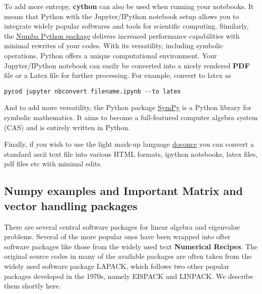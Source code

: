 \documentclass[%
oneside,                 %
final,                   %
10pt]{article}
\begin{document}
To add more entropy, \textbf{cython} can also be used when running your
notebooks. It means that Python with the Jupyter/IPython notebook
setup allows you to integrate widely popular softwares and tools for
scientific computing. Similarly, the 
\href{{https://numba.pydata.org/}}{Numba Python package} delivers increased performance
capabilities with minimal rewrites of your codes.  With its
versatility, including symbolic operations, Python offers a unique
computational environment. Your Jupyter/IPython notebook can easily be
converted into a nicely rendered \textbf{PDF} file or a Latex file for
further processing. For example, convert to latex as 

\begin{Verbatim}[numbers=none,fontsize=\fontsize{9pt}{9pt},baselinestretch=0.95]
pycod jupyter nbconvert filename.ipynb --to latex 
\end{Verbatim}

And to add more versatility, the Python package \href{{http://www.sympy.org/en/index.html}}{SymPy} is a Python library for symbolic mathematics. It aims to become a full-featured computer algebra system (CAS)  and is entirely written in Python. 

Finally, if you wish to use the light mark-up language 
\href{{https://github.com/hplgit/doconce}}{doconce} you can convert a standard ascii text file into various HTML 
formats, ipython notebooks, latex files, pdf files etc with minimal edits.



\subsection*{Numpy examples and Important Matrix and vector handling packages}

There are several central software packages for linear algebra and eigenvalue problems. Several of the more
popular ones have been wrapped into ofter software packages like those from the widely used text \textbf{Numerical Recipes}. The original source codes in many of the available packages are often taken from the widely used
software package LAPACK, which follows two other popular packages
developed in the 1970s, namely EISPACK and LINPACK.  We describe them shortly here.
\end{document}
